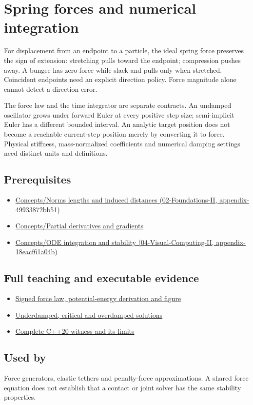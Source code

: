 \hypertarget{appendix-e040e2108923}{}
\section{Spring forces and numerical integration}\label{appendix-e040e2108923-spring-forces-and-numerical-integration}

For displacement from an endpoint to a particle, the ideal spring force preserves the sign of extension: stretching pulls toward the endpoint; compression pushes away. A bungee has zero force while slack and pulls only when stretched. Coincident endpoints need an explicit direction policy. Force magnitude alone cannot detect a direction error.

The force law and the time integrator are separate contracts. An undamped oscillator grows under forward Euler at every positive step size; semi-implicit Euler has a different bounded interval. An analytic target position does not become a reachable current-step position merely by converting it to force. Physical stiffness, mass-normalized coefficients and numerical damping settings need distinct units and definitions.

\subsection{Prerequisites}\label{appendix-e040e2108923-prerequisites}

\begin{itemize}
\tightlist
\item
  \href{../02-Foundations-II/main.pdf\#nameddest=appendix-49933872bb51}{Concepts/Norms lengths and induced distances (02-Foundations-II, appendix-49933872bb51)}
\item
  \hyperref[appendix-677b59746ae0]{Concepts/Partial derivatives and gradients}
\item
  \href{../04-Visual-Computing-II/main.pdf\#nameddest=appendix-18eacf61a04b}{Concepts/ODE integration and stability (04-Visual-Computing-II, appendix-18eacf61a04b)}
\end{itemize}

\subsection{Full teaching and executable evidence}\label{appendix-e040e2108923-full-teaching-and-executable-evidence}

\begin{itemize}
\tightlist
\item
  \hyperref[06-engine-ii-ch047-a-spring-law-is-signed-not-just-a-magnitude]{Signed force law, potential-energy derivation and figure}
\item
  \hyperref[06-engine-ii-ch047-solve-each-linear-damping-regime-with-its-own-form]{Underdamped, critical and overdamped solutions}
\item
  \hyperref[06-engine-ii-ch047-standalone-spring-direction-and-integration-order-laboratory]{Complete C++20 witness and its limits}
\end{itemize}

\subsection{Used by}\label{appendix-e040e2108923-used-by}

Force generators, elastic tethers and penalty-force approximations. A shared force equation does not establish that a contact or joint solver has the same stability properties.
